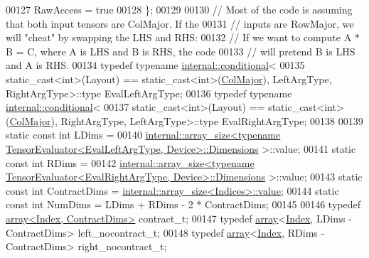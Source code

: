 \begin{DoxyCode}
00127     RawAccess = \textcolor{keyword}{true}
00128   \};
00129 
00130   \textcolor{comment}{// Most of the code is assuming that both input tensors are ColMajor. If the}
00131   \textcolor{comment}{// inputs are RowMajor, we will "cheat" by swapping the LHS and RHS:}
00132   \textcolor{comment}{// If we want to compute A * B = C, where A is LHS and B is RHS, the code}
00133   \textcolor{comment}{// will pretend B is LHS and A is RHS.}
00134   \textcolor{keyword}{typedef} \textcolor{keyword}{typename} \hyperlink{struct_eigen_1_1internal_1_1conditional}{internal::conditional}<
00135     \textcolor{keyword}{static\_cast<}\textcolor{keywordtype}{int}\textcolor{keyword}{>}(Layout) == static\_cast<int>(\hyperlink{group__enums_ggaacded1a18ae58b0f554751f6cdf9eb13a0cbd4bdd0abcfc0224c5fcb5e4f6669a}{ColMajor}), LeftArgType, RightArgType>::type 
      EvalLeftArgType;
00136   \textcolor{keyword}{typedef} \textcolor{keyword}{typename} \hyperlink{struct_eigen_1_1internal_1_1conditional}{internal::conditional}<
00137     \textcolor{keyword}{static\_cast<}\textcolor{keywordtype}{int}\textcolor{keyword}{>}(Layout) == static\_cast<int>(\hyperlink{group__enums_ggaacded1a18ae58b0f554751f6cdf9eb13a0cbd4bdd0abcfc0224c5fcb5e4f6669a}{ColMajor}), RightArgType, LeftArgType>::type 
      EvalRightArgType;
00138 
00139   \textcolor{keyword}{static} \textcolor{keyword}{const} \textcolor{keywordtype}{int} LDims =
00140       
      \hyperlink{struct_eigen_1_1internal_1_1array__size}{internal::array\_size<typename TensorEvaluator<EvalLeftArgType, Device>::Dimensions}
      >::value;
00141   \textcolor{keyword}{static} \textcolor{keyword}{const} \textcolor{keywordtype}{int} RDims =
00142       
      \hyperlink{struct_eigen_1_1internal_1_1array__size}{internal::array\_size<typename TensorEvaluator<EvalRightArgType, Device>::Dimensions}
      >::value;
00143   \textcolor{keyword}{static} \textcolor{keyword}{const} \textcolor{keywordtype}{int} ContractDims = \hyperlink{struct_eigen_1_1internal_1_1array__size}{internal::array\_size<Indices>::value};
00144   \textcolor{keyword}{static} \textcolor{keyword}{const} \textcolor{keywordtype}{int} NumDims = LDims + RDims - 2 * ContractDims;
00145 
00146   \textcolor{keyword}{typedef} \hyperlink{class_eigen_1_1array}{array<Index, ContractDims>} contract\_t;
00147   \textcolor{keyword}{typedef} \hyperlink{class_eigen_1_1array}{array}<\hyperlink{namespace_eigen_a62e77e0933482dafde8fe197d9a2cfde}{Index}, LDims - ContractDims> left\_nocontract\_t;
00148   \textcolor{keyword}{typedef} \hyperlink{class_eigen_1_1array}{array}<\hyperlink{namespace_eigen_a62e77e0933482dafde8fe197d9a2cfde}{Index}, RDims - ContractDims> right\_nocontract\_t;

\end{DoxyCode}
